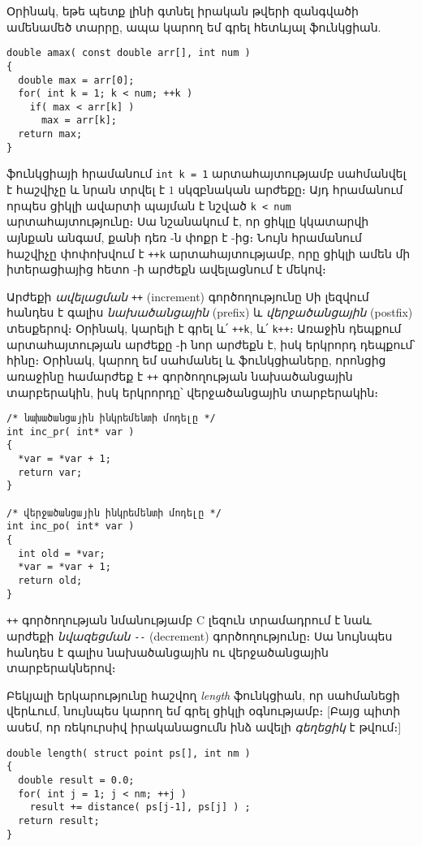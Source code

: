 Օրինակ, եթե պետք լինի գտնել իրական թվերի զանգվածի ամենամեծ տարրը, ապա կարող
եմ գրել հետևյալ ֆունկցիան.

\begin{Verbatim}
double amax( const double arr[], int num )
{
  double max = arr[0];
  for( int k = 1; k < num; ++k )
    if( max < arr[k] )
      max = arr[k];
  return max;
}
\end{Verbatim}

 ֆունկցիայի  հրամանում \texttt{int k = 1} արտահայտությամբ
սահմանվել է  հաշվիչը և նրան տրվել է \(1\) սկզբնական արժեքը։ Այդ
 հրամանում որպես ցիկլի ավարտի պայման է նշված \texttt{k < num}
արտահայտությունը։ Սա նշանակում է, որ ցիկլը կկատարվի այնքան անգամ, քանի դեռ
-ն փոքր է -ից։ Նույն  հրամանում 
հաշվիչը փոփոխվում է \Verb|++k| արտահայտությամբ, որը ցիկլի ամեն մի
իտերացիայից հետո -ի արժեքն ավելացնում է մեկով։

Արժեքի \emph{ավելացման} \Verb|++| (increment) գործողությունը Սի լեզվում
հանդես է գալիս \emph{նախածանցային} (prefix) և \emph{վերջածանցային}
(postfix) տեսքերով։ Օրինակ, կարելի է գրել և՛ \Verb|++k|, և՛ \Verb|k++|։
Առաջին դեպքում արտահայտության արժեքը -ի նոր արժեքն է, իսկ երկրորդ
դեպքում՝ հինը։ Օրինակ, կարող եմ սահմանել  և 
ֆունկցիաները, որոնցից առաջինը համարժեք է \Verb|++| գործողության նախածանցային
տարբերակին, իսկ երկրորդը՝ վերջածանցային տարբերակին։

\begin{Verbatim}
/* նախածանցային ինկրեմենտի մոդելը */
int inc_pr( int* var )
{
  *var = *var + 1;
  return var;
}

/* վերջածանցային ինկրեմենտի մոդելը */
int inc_po( int* var )
{
  int old = *var;
  *var = *var + 1;
  return old;
}
\end{Verbatim}

\Verb|++| գործողության նմանությամբ C լեզուն տրամադրում է նաև արժեքի
\emph{նվազեցման} \Verb|--| (decrement) գործողությունը։ Սա նույնպես հանդես
է գալիս նախածանցային ու վերջածանցային տարբերակներով։


Բեկյալի երկարությունը հաշվող \emph{length} ֆունկցիան, որ սահմանեցի վերևում,
նույնպես կարող եմ գրել  ցիկլի օգնությամբ։ [Բայց պիտի ասեմ, որ
ռեկուրսիվ իրականացումն ինձ ավելի \emph{գեղեցիկ} է թվում։]

\begin{Verbatim}
double length( struct point ps[], int nm )
{
  double result = 0.0;
  for( int j = 1; j < nm; ++j )
    result += distance( ps[j-1], ps[j] ) ;
  return result;
}
\end{Verbatim}

